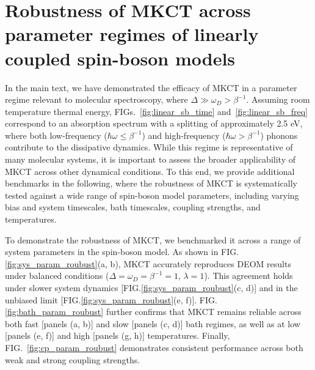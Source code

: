 \documentclass[preprint,aip,jcp]{revtex4-2}
\begin{document}
\section{\label{app:parameters}Robustness of MKCT across parameter regimes of linearly coupled spin-boson models}
In the main text, we have demonstrated the efficacy of MKCT in a parameter regime relevant to molecular spectroscopy, where $\Delta \gg \omega_D > \beta^{-1}$. Assuming room temperature thermal energy, FIGs.~\ref{fig:linear_sb_time} and~\ref{fig:linear_sb_freq} correspond to an absorption spectrum with a splitting of approximately 2.5 eV, where both low-frequency ($\hbar\omega \leq \beta^{-1}$) and high-frequency ($\hbar\omega > \beta^{-1}$) phonons contribute to the dissipative dynamics. While this regime is representative of many molecular systems, it is important to assess the broader applicability of MKCT across other dynamical conditions. To this end, we provide additional benchmarks in the following, where the robustness of MKCT is systematically tested against a wide range of spin-boson model parameters, including varying bias and system timescales, bath timescales, coupling strengths, and temperatures.

To demonstrate the robustness of MKCT, we benchmarked it across a range of system parameters in the spin-boson model. As shown in FIG.\ref{fig:sys_param_roubust}(a, b), MKCT accurately reproduces DEOM results under balanced conditions ($\Delta = \omega_D = \beta^{-1} = 1$, $\lambda = 1$). This agreement holds under slower system dynamics [FIG.\ref{fig:sys_param_roubust}(c, d)] and in the unbiased limit [FIG.\ref{fig:sys_param_roubust}(e, f)]. FIG.\ref{fig:bath_param_roubust} further confirms that MKCT remains reliable across both fast [panels (a, b)] and slow [panels (c, d)] bath regimes, as well as at low [panels (e, f)] and high [panels (g, h)] temperatures. Finally, FIG.~\ref{fig:cp_param_roubust} demonstrates consistent performance across both weak and strong coupling strengths.
\end{document}
